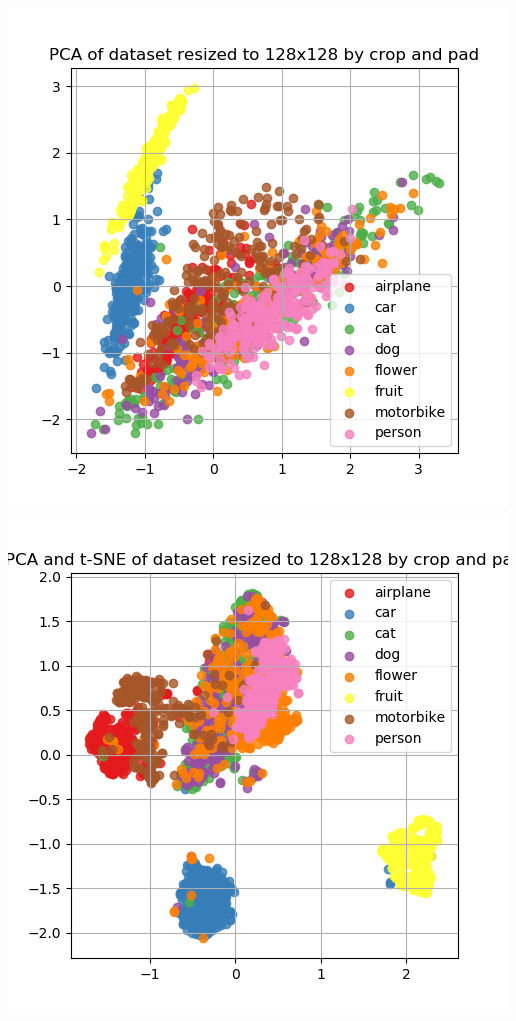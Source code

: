 \documentclass{article}
\begin{document}
\begin{minipage}[c]{\linewidth}
	\includegraphics[width= \figureWidth\textwidth]{./figures/pca_h128_w128_cp_none.png}
	\includegraphics[width= \figureWidth\textwidth]{./figures/pca_tsne_h128_w128_cp_none.png}

\end{minipage}
\end{document}

